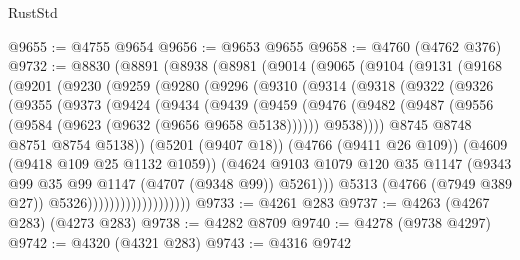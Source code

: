 \begin{lexlean}{RustStd}
\begin{coremodule}
@9655 := @4755 @9654
@9656 := @9653 @9655
@9658 := @4760 (@4762 @376)
@9732 := @8830
    (@8891
      (@8938
        (@8981
          (@9014
            (@9065
              (@9104
                (@9131
                  (@9168
                    (@9201
                      (@9230
                        (@9259
                          (@9280
                            (@9296
                              (@9310
                                (@9314
                                  (@9318
                                    (@9322
                                      (@9326
                                        (@9355
                                          (@9373
                                            (@9424
                                              (@9434
                                                (@9439
                                                  (@9459
                                                    (@9476
                                                      (@9482
                                                        (@9487
                                                          (@9556
                                                            (@9584
                                                              (@9623 (@9632 (@9656 @9658 @5138))))))
                                                        @9538))))
                                                @8745
                                                @8748
                                                @8751
                                                @8754
                                                @5138))
                                            (@5201 (@9407 @18))
                                            (@4766 (@9411 @26 @109))
                                            (@4609 (@9418 @109 @25 @1132 @1059))
                                            (@4624
                                              @9103
                                              @1079
                                              @120
                                              @35
                                              @1147
                                              (@9343 @99 @35 @99 @1147 (@4707 (@9348 @99)) @5261)))
                                          @5313
                                          (@4766 (@7949 @389 @27))
                                          @5326)))))))))))))))))))
@9733 := @4261 @283
@9737 := @4263 (@4267 @283) (@4273 @283)
@9738 := @4282 @8709
@9740 := @4278 (@9738 @4297)
@9742 := @4320 (@4321 @283)
@9743 := @4316 @9742

\end{coremodule}
\end{lexlean}
